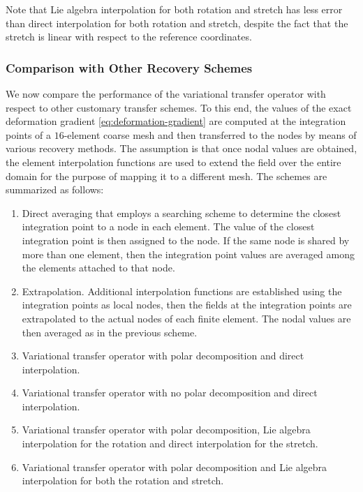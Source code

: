 \documentclass[12pt]{article}
\begin{document}
Note that Lie algebra interpolation for both rotation and stretch has
less error than direct interpolation for both rotation and stretch,
despite the fact that the stretch is linear with respect to the
reference coordinates.

\subsubsection{Comparison with Other Recovery Schemes}
\label{sec:recovery-schemes}

We now compare the performance of the variational transfer operator with respect
to other customary transfer schemes. To this end, the values of the exact
deformation gradient \eqref{eq:deformation-gradient} are computed at the
integration points of a $16$-element coarse mesh and then transferred to the
nodes by means of various recovery methods. The assumption is that once nodal
values are obtained, the element interpolation functions are used to extend the
field over the entire domain for the purpose of mapping it to a different mesh.
The schemes are summarized as follows:
\begin{enumerate}
  \item Direct averaging that employs a searching scheme to determine
  the closest integration point to a node in each element. The value
  of the closest integration point is then assigned to the node. If
  the same node is shared by more than one element, then the
  integration point values are averaged among the elements attached to
  that node.
  \item Extrapolation. Additional interpolation functions are
  established using the integration points as local nodes, then the
  fields at the integration points are extrapolated to the actual
  nodes of each finite element. The nodal values are then averaged as
  in the previous scheme.
  \item Variational transfer operator with polar decomposition
  and direct interpolation.
  \item Variational transfer operator with no polar decomposition and
    direct interpolation.
  \item Variational transfer operator with polar decomposition, Lie
    algebra interpolation for the rotation and direct interpolation
    for the stretch.
  \item Variational transfer operator with polar decomposition and Lie
    algebra interpolation for both the rotation and stretch.
\end{enumerate}
\end{document}
